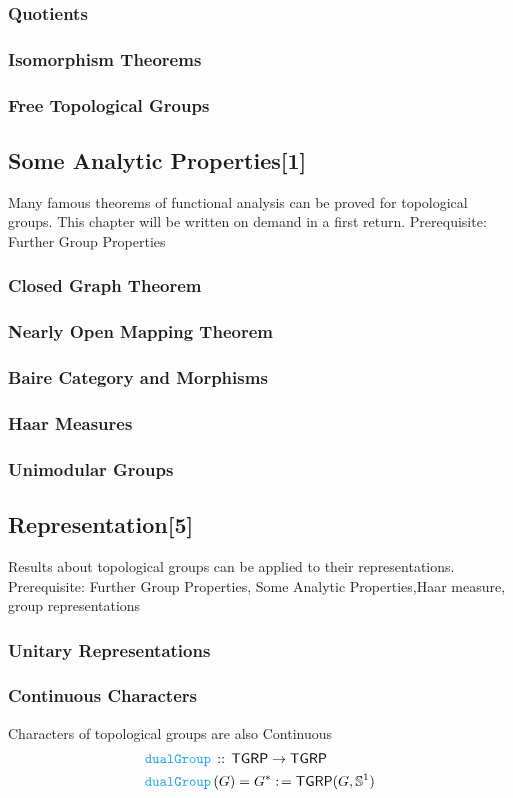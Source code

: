 \documentclass[12pt]{scrartcl}
\newcommand{\FUNC}[1]{\textcolor{Cerulean}{\mathtt{#1}}}
\renewcommand{\.}{\; . \;}
\newcommand{\de}{: \kern 0.1pc =}
\newcommand{\Act}[1]{\left( #1 \right)}
\newcommand{\DeclareFunc}[2]{& \FUNC{#1} \, :: \, #2 \\}
\newcommand{\DefineNamedFunc}[4]{&  \FUNC{#1}\Act{#2} = #3 \de #4 \\}
\newcommand{\Page}[1]{ \begin{align*} #1 \end{align*}   }
\newcommand{\Sphere}{\mathbb{S}}
\newcommand{\TGRP}{\mathsf{TGRP}}
\begin{document}
\subsubsection{Quotients}
\subsubsection{Isomorphism Theorems}
\subsubsection{Free Topological Groups}
\subsection{Some Analytic Properties[1]}
Many famous theorems of functional analysis can be proved for topological groups.
This chapter will be written on demand in a first return.
Prerequisite: Further Group Properties
\subsubsection{Closed Graph Theorem}
\subsubsection{Nearly Open Mapping Theorem}
\subsubsection{Baire Category and Morphisms}
\subsubsection{Haar Measures}
\subsubsection{Unimodular Groups}
\newpage
\subsection{Representation[5]}
Results about topological groups can be applied to their representations.
Prerequisite: Further Group Properties, Some Analytic Properties,Haar measure, group representations
\subsubsection{Unitary Representations}
\subsubsection{Continuous Characters}
Characters of topological groups are also Continuous
\Page{
	\DeclareFunc{dualGroup}{\TGRP \to \TGRP}
	\DefineNamedFunc{dualGroup}{G}{G^*}{\TGRP(G,\Sphere^1)}
}
\newpage
\end{document}
